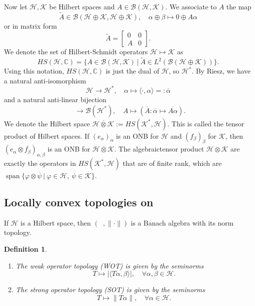 \documentclass[10pt, a4paper]{article}
\newtheorem{defi}[thm]{Definition}
\newenvironment{noticeB}{%
  \tcolorbox[%
  notitle,
  empty,
  enhanced,  %
  breakable,
  coltext=black,
  colback=white, 
  fontupper=\rmfamily,
  noparskip,
  sharp corners,
  boxrule=-1pt,  %
  frame hidden,
  left=7pt,  %
  right=7pt,
  top=5pt,
  bottom=5pt,
  before skip=2.5ex plus 2pt,
  after skip=2.5ex plus 2pt,
  borderline west = {1.5pt}{-0.1pt}{blue!30!black}, %
  overlay unbroken and last={%
    \draw[color=black, line width=1.25pt]
    ($(frame.south west)+(1.pt, -0.1pt)$) -- ++(2em, 0);
  }
  ]}
{\endtcolorbox}
\newenvironment{definition}{\begin{noticeB}\begin{defi}}{%
    \end{defi}\end{noticeB}}
\newcommand{\C}{\mathbb {C}}
\DeclareMathOperator{\linspan}{span}
\DeclareMathOperator{\bh}{\mathcal{B} (\mathcal{H})}
\begin{document}
Now let $\mathcal{H}, \mathcal{K}$ be Hilbert spaces and $A \in \mathcal{B} (\mathcal{H}, \mathcal{K})$.
We associate to $A$ the map 
$$\widetilde{A} \in \mathcal{B} (\mathcal{H} \oplus \mathcal{K}, \mathcal{H} \oplus \mathcal{K}),\quad \alpha \oplus \beta \mapsto 0 \oplus A \alpha$$
or in matrix form 
$$\widetilde{A} = \begin{bmatrix}
  0 & 0\\
  A & 0
\end{bmatrix}.$$
We denote the set of Hilbert-Schmidt operators $\mathcal{H} \mapsto \mathcal{K}$ as 
$$HS (\mathcal{H}, \C) = \{A \in \mathcal{B} (\mathcal{H}, \mathcal{K})\ |\ \widetilde{A} \in L^2 (\mathcal{B}(\mathcal{H} \oplus \mathcal{K}))\}.$$
Using this notation, $HS (\mathcal{H}, \C)$ is just the dual of $\mathcal{H}$, so $\mathcal{H}^*$.
By Riesz, we have a natural anti-isomorphism 
$$\mathcal{H} \to \mathcal{H}^*,\quad \alpha \mapsto \langle \cdot , \alpha\rangle =: \overline{\alpha}$$
and a natural anti-linear bijection 
$$\bh \to \mathcal{B} (\mathcal{H}^*),\quad A \mapsto (\overline{A}: \overline{\alpha} \mapsto \overline{A \alpha}).$$
We denote the Hilbert space $\mathcal{H} \overline{\otimes} \mathcal{K} := HS (\mathcal{K}^*, \mathcal{H})$.
This is called the tensor product of Hilbert spaces. If $(e_\alpha)_\alpha$ is an ONB for $\mathcal{H}$ and $(f_\beta)_\beta$ for $\mathcal{K}$, then 
$(e_\alpha \otimes\overline{f_\beta})_{\alpha, \beta}$ is an ONB for $\mathcal{H} \overline{\otimes} \mathcal{K}$.
The algebraictensor product $\mathcal{H} \otimes \mathcal{K}$ are exactly the operators in $HS (\mathcal{K}^*, \mathcal{H})$ that are of finite rank, which are 
$\linspan \{\varphi \otimes \overline{\psi}\ |\ \varphi \in \mathcal{H},\ \psi \in \mathcal{K}\}$.

\subsection{Locally convex topologies on $\bh$}

If $\mathcal{H}$ is a Hilbert space, then $(\bh, \| \cdot\|)$
is a Banach algebra with its norm topology.

\begin{definition}
  \begin{enumerate}
    \item The weak operator topology (WOT) is given by the seminorms 
    $$T \mapsto |\langle T\alpha, \beta\rangle|,\quad \forall \alpha, \beta \in \mathcal{H}.$$
    \item The strong operator topology (SOT) is given by the seminorms 
    $$T \mapsto \|T\alpha\|,\quad \forall \alpha \in \mathcal{H}.$$
  \end{enumerate}
\end{definition}
\end{document}
